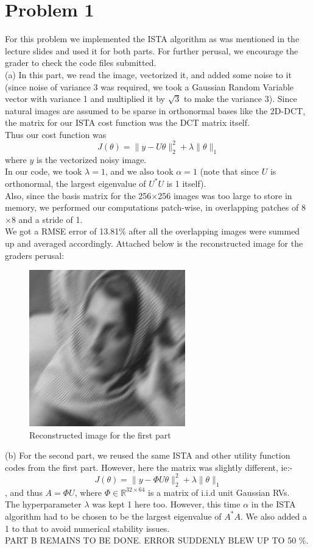 \documentclass[a4paper,11pt]{article}
\numberwithin{definition}{section}
\numberwithin{mytheorem}{subsection}
\begin{document}
\section{Problem 1}
For this problem we implemented the ISTA algorithm as was mentioned in the lecture slides and used it for both parts. For further perusal, we encourage the grader to check the code files submitted.\\
(a) In this part, we read the image, vectorized it, and added some noise to it (since noise of variance 3 was required, we took a Gaussian Random Variable vector with variance 1 and multiplied it by $\sqrt{3}$ to make the variance 3). Since natural images are assumed to be sparse in orthonormal bases like the 2D-DCT, the matrix for our ISTA cost function was the DCT matrix itself. \\
Thus our cost function was
$$J(\theta) = \lVert y - U\theta\rVert^2_2 + \lambda\lVert\theta\rVert_1$$
where $y$ is the vectorized noisy image.\\
In our code, we took $\lambda = 1$, and we also took $\alpha = 1$ (note that since $U$ is orthonormal, the largest eigenvalue of $U^*U$ is 1 itself).\\
Also, since the basis matrix for the 256$\times$256 images was too large to store in memory, we performed our computations patch-wise, in overlapping patches of 8$\times$8 and a stride of 1.\\
We got a RMSE error of 13.81\% after all the overlapping images were summed up and averaged accordingly.
Attached below is the reconstructed image for the graders perusal:
\begin{figure}[H]
    \includegraphics{1a.jpg}
    \caption{Reconstructed image for the first part}
\end{figure}
(b) For the second part, we reused the same ISTA and other utility function codes from the first part. However, here the matrix was slightly different, ie:- 
$$J(\theta) = \lVert y - \Phi U\theta\rVert^2_2 + \lambda\lVert\theta\rVert_1$$
, and thus $A = \Phi U$, where $\Phi\in\mathbb{R}^{32\times 64}$ is a matrix of i.i.d unit Gaussian RVs. \\
The hyperparameter $\lambda$ was kept 1 here too. However, this time $\alpha$ in the ISTA algorithm had to be chosen to be the largest eigenvalue of $A^*A$. We also added a 1 to that to avoid numerical stability issues.\\
PART B REMAINS TO BE DONE. ERROR SUDDENLY BLEW UP TO 50 \%.  
\end{document}
